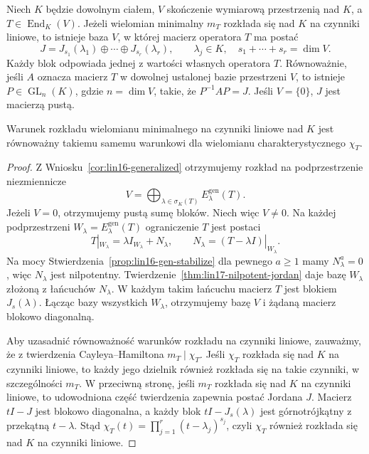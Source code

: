 \begin{twierdzenie}
\label{thm:lin17-jordan}
Niech \(K\) będzie dowolnym ciałem,
\(V\) skończenie wymiarową przestrzenią nad \(K\),
a \(T\in\operatorname{End}_K(V)\).
Jeżeli wielomian minimalny \(m_T\)
rozkłada się nad \(K\) na czynniki liniowe,
to istnieje baza \(V\), w której
macierz operatora \(T\) ma postać
\[
 J=J_{s_1}(\lambda_1)\oplus\cdots
   \oplus J_{s_r}(\lambda_r),
 \qquad \lambda_j\in K,\quad
 s_1+\cdots+s_r=\dim V.
\]
Każdy blok odpowiada jednej z wartości własnych
operatora \(T\). Równoważnie, jeśli \(A\)
oznacza macierz \(T\) w dowolnej ustalonej bazie
przestrzeni \(V\), to istnieje
\(P\in\operatorname{GL}_{n}(K)\),
gdzie \(n=\dim V\), takie, że
\(P^{-1}AP=J\).
Jeśli \(V=\{0\}\), \(J\) jest macierzą pustą.

Warunek rozkładu wielomianu minimalnego
na czynniki liniowe nad \(K\) jest równoważny
takiemu samemu warunkowi dla wielomianu
charakterystycznego \(\chi_T\).
\end{twierdzenie}
\begin{proof}
Z Wniosku~\ref{cor:lin16-generalized}
otrzymujemy rozkład na podprzestrzenie
niezmiennicze
\[
 V=\bigoplus_{\lambda\in\sigma_K(T)}
 E_\lambda^{\mathrm{gen}}(T).
\]
Jeżeli \(V=0\), otrzymujemy pustą sumę bloków.
Niech więc \(V\ne0\).
Na każdej podprzestrzeni
\(W_\lambda=E_\lambda^{\mathrm{gen}}(T)\)
ograniczenie \(T\) jest postaci
\[
 T|_{W_\lambda}=\lambda I_{W_\lambda}+N_\lambda,
 \qquad N_\lambda=(T-\lambda I)|_{W_\lambda}.
\]
Na mocy
Stwierdzenia~\ref{prop:lin16-gen-stabilize}
dla pewnego \(a\ge1\) mamy
\(N_\lambda^a=0\), więc \(N_\lambda\)
jest nilpotentny.
Twierdzenie~\ref{thm:lin17-nilpotent-jordan}
daje bazę \(W_\lambda\) złożoną
z łańcuchów \(N_\lambda\).
W każdym takim łańcuchu
macierz \(T\) jest blokiem \(J_s(\lambda)\).
Łącząc bazy wszystkich \(W_\lambda\),
otrzymujemy bazę \(V\) i żądaną
macierz blokowo diagonalną.

Aby uzasadnić równoważność warunków
rozkładu na czynniki liniowe, zauważmy,
że z twierdzenia
Cayleya--Hamiltona
\(m_T\mid\chi_T\).
Jeśli \(\chi_T\) rozkłada się nad \(K\)
na czynniki liniowe, to każdy jego dzielnik
również rozkłada się na takie czynniki,
w szczególności \(m_T\).
W przeciwną stronę, jeśli \(m_T\)
rozkłada się nad \(K\) na czynniki liniowe,
to udowodniona część
twierdzenia zapewnia postać Jordana \(J\).
Macierz \(tI-J\) jest blokowo diagonalna,
a każdy blok \(tI-J_s(\lambda)\)
jest górnotrójkątny z przekątną \(t-\lambda\).
Stąd
\(\chi_T(t)=\prod_{j=1}^r(t-\lambda_j)^{s_j}\),
czyli \(\chi_T\) również rozkłada się
nad \(K\) na czynniki liniowe.
\end{proof}

